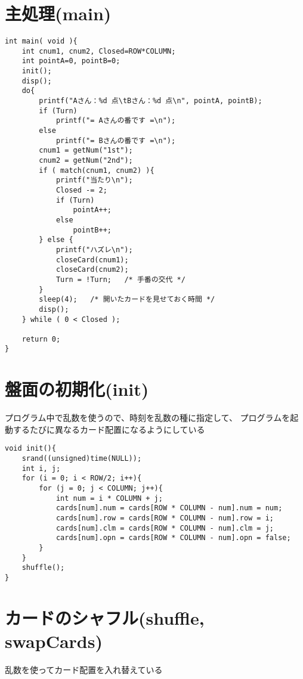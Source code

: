 \documentclass[uplatex,a4paper,11pt,oneside,openany]{jsbook}
\begin{document}
\newpage

\section{主処理(main)}

\begin{lstlisting}
int main( void ){
    int cnum1, cnum2, Closed=ROW*COLUMN;
    int pointA=0, pointB=0;
    init();
    disp();
    do{
        printf("Aさん：%d 点\tBさん：%d 点\n", pointA, pointB);
        if (Turn)
            printf("= Aさんの番です =\n");
        else
            printf("= Bさんの番です =\n");
        cnum1 = getNum("1st");
        cnum2 = getNum("2nd");
        if ( match(cnum1, cnum2) ){
            printf("当たり\n");
            Closed -= 2;
            if (Turn)
                pointA++;
            else
                pointB++;
        } else {
            printf("ハズレ\n");
            closeCard(cnum1);
            closeCard(cnum2);
            Turn = !Turn;   /* 手番の交代 */
        }
        sleep(4);   /* 開いたカードを見せておく時間 */
        disp();
    } while ( 0 < Closed );

    return 0;
}
\end{lstlisting}

\section{盤面の初期化(init)}

プログラム中で乱数を使うので、時刻を乱数の種に指定して、
プログラムを起動するたびに異なるカード配置になるようにしている

\begin{lstlisting}
void init(){
    srand((unsigned)time(NULL));
    int i, j;
    for (i = 0; i < ROW/2; i++){
        for (j = 0; j < COLUMN; j++){
            int num = i * COLUMN + j;
            cards[num].num = cards[ROW * COLUMN - num].num = num;
            cards[num].row = cards[ROW * COLUMN - num].row = i;
            cards[num].clm = cards[ROW * COLUMN - num].clm = j;
            cards[num].opn = cards[ROW * COLUMN - num].opn = false;
        }
    }
    shuffle();
}
\end{lstlisting}

\section{カードのシャフル(shuffle, swapCards)}

乱数を使ってカード配置を入れ替えている
\end{document}
